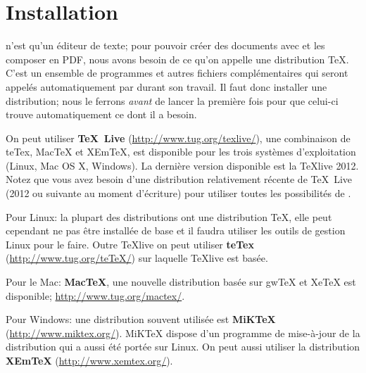 
\chapter{Installation}
\label{chap.installation}

\Tw{} n'est qu'un éditeur de texte; pour pouvoir créer des documents avec \AllTeX{} et les composer en PDF, nous avons besoin de ce qu'on appelle une distribution \TeX{}. C'est un ensemble de programmes et autres fichiers complémentaires qui seront appelés automatiquement par \Tw{} durant son travail. Il faut donc installer une distribution; nous le ferrons \emph{avant} de lancer \Tw{} la première fois pour que celui-ci trouve automatiquement ce dont il a besoin.

On peut utiliser \textbf{TeX~Live} (\url{http://www.tug.org/texlive/}), une combinaison de teTex, MacTeX et XEmTeX, est disponible pour les trois systèmes d'exploitation (Linux, Mac OS X, Windows). La dernière version disponible est la TeXlive 2012. Notez que vous avez besoin d'une distribution relativement récente de TeX~Live (2012 ou suivante au moment d'écriture) pour utiliser toutes les possibilités de {\Tw}.

\begin{OSLinux}
Pour Linux: la plupart des distributions ont une distribution \TeX, elle peut cependant ne pas être installée de base et il faudra utiliser les outils de gestion Linux pour le faire. Outre TeXlive on peut utiliser \textbf{teTex} (\url{http://www.tug.org/teTeX/}) sur laquelle TeXlive est basée. 
\end{OSLinux}
\vspace{6pt} 

\begin{OSMac}
Pour le Mac: \textbf{MacTeX}, une nouvelle distribution basée sur gwTeX et XeTeX est disponible; \url{http://www.tug.org/mactex/}.
\end{OSMac}
\vspace{6pt} 

\begin{OSWindows}
Pour Windows: une distribution souvent utilisée est \textbf{MiKTeX} (\url{http://www.miktex.org/}). MiKTeX dispose d'un programme de mise-à-jour de la distribution qui a aussi été portée sur Linux. On peut aussi utiliser la distribution \textbf{XEmTeX} (\url{http://www.xemtex.org/}).
\end{OSWindows}

